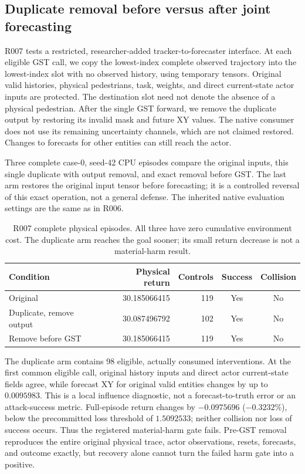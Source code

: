 \subsection{Duplicate removal before versus after joint forecasting}
R007 tests a restricted, researcher-added tracker-to-forecaster interface.
At each eligible GST call, we copy the lowest-index complete observed
trajectory into the lowest-index slot with no observed history, using
temporary tensors. Original valid histories, physical pedestrians, task,
weights, and direct current-state actor inputs are protected. The destination
slot need not denote the absence of a physical pedestrian. After the single
GST forward, we remove the duplicate output by restoring its invalid mask
and future XY values. The native consumer does not use its remaining
uncertainty channels, which are not claimed restored. Changes to forecasts
for other entities can still reach the actor.

Three complete case-0, seed-42 CPU episodes compare the original inputs,
this single duplicate with output removal, and exact removal before GST.
The last arm restores the original input tensor before forecasting; it is
a controlled reversal of this exact operation, not a general defense.
The inherited native evaluation settings are the same as in R006.

\begin{table}[ht]
\centering
\begin{tabular}{lrrcc}
\toprule
Condition & Physical return & Controls & Success & Collision \\
\midrule
Original & 30.185066415 & 119 & Yes & No \\
Duplicate, remove output & 30.087496792 & 102 & Yes & No \\
Remove before GST & 30.185066415 & 119 & Yes & No \\
\bottomrule
\end{tabular}
\caption{R007 complete physical episodes. All three have zero cumulative
environment cost. The duplicate arm reaches the goal sooner; its small
return decrease is not a material-harm result.}
\end{table}

The duplicate arm contains 98 eligible, actually consumed interventions.
At the first common eligible call, original history inputs and direct actor
current-state fields agree, while forecast XY for original valid entities
changes by up to $0.0095983$. This is a local influence diagnostic, not a
forecast-to-truth error or an attack-success metric. Full-episode return
changes by $-0.0975696$ ($-0.3232\%$), below the precommitted loss threshold
of $1.5092533$; neither collision nor loss of success occurs. Thus the
registered material-harm gate fails. Pre-GST removal reproduces the entire
original physical trace, actor observations, resets, forecasts, and outcome
exactly, but recovery alone cannot turn the failed harm gate into a positive.

